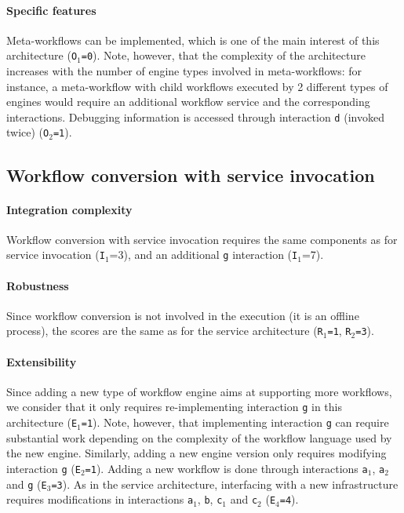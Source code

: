 \documentclass[preprint,3p,twocolumn]{elsarticle}
\begin{document}
\paragraph{Specific features}
Meta-workflows can be implemented, which is one of the main interest
of this architecture (\texttt{O$_1$=0}). Note, however, that the
complexity of the architecture increases with the number of engine
types involved in meta-workflows: for instance, a meta-workflow with
child workflows executed by 2 different types of engines would require an
additional workflow service and the corresponding interactions.
Debugging information is accessed through interaction \texttt{d} (invoked twice) (\texttt{O$_2$=1}).

\subsection{Workflow conversion with service invocation}

\paragraph{Integration complexity} Workflow conversion with service invocation
requires the same components as for service invocation
(\texttt{I$_1$}=3), and an additional \texttt{g} interaction (\texttt{I$_1$}=7).

\paragraph{Robustness} Since workflow conversion is not involved in
the execution (it is an offline process), the scores are the same as for the
service architecture (\texttt{R$_1$=1}, \texttt{R$_2$=3}).

\paragraph{Extensibility} Since adding a new type of workflow engine
aims at supporting more workflows, we consider that it only requires
re-implementing interaction \texttt{g} in this architecture  (\texttt{E$_1$=1}). Note,
however, that implementing interaction \texttt{g} can require
substantial work depending on the complexity of the workflow language used by
the new engine. Similarly, adding a
new engine version only requires modifying interaction \texttt{g}
(\texttt{E$_2$=1}).  Adding a new workflow is done through
interactions \texttt{a$_1$}, \texttt{a$_2$} and \texttt{g} (\texttt{E$_3$=3}). As in the
service architecture, interfacing with a new infrastructure requires
modifications in interactions \texttt{a$_1$}, \texttt{b}, \texttt{c$_1$}
and \texttt{c$_2$} (\texttt{E$_4$=4}).
\end{document}
